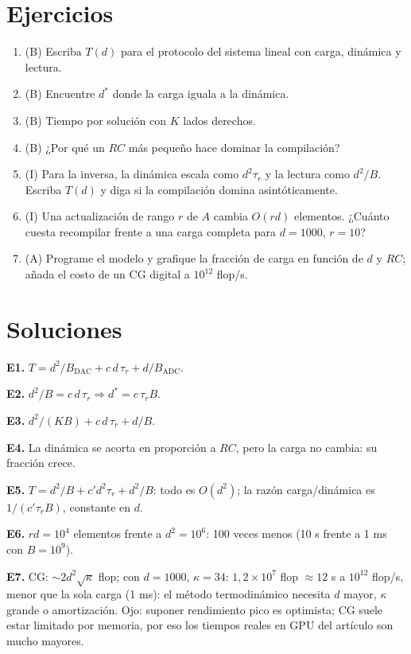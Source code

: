 \documentclass[11pt,a4paper]{article}
\begin{document}
\section{Ejercicios}
\begin{enumerate}[label=\textbf{E\arabic*.}]
\item (B) Escriba $T(d)$ para el protocolo del sistema lineal con carga, dinámica y lectura.
\item (B) Encuentre $d^\ast$ donde la carga iguala a la dinámica.
\item (B) Tiempo por solución con $K$ lados derechos.
\item (B) ¿Por qué un $RC$ más pequeño hace dominar la compilación?
\item (I) Para la inversa, la dinámica escala como $d^2\tau_r$ y la lectura como $d^2/B$. Escriba $T(d)$ y diga si la compilación domina asintóticamente.
\item (I) Una actualización de rango $r$ de $A$ cambia $O(rd)$ elementos. ¿Cuánto cuesta recompilar frente a una carga completa para $d=1000$, $r=10$?
\item (A) Programe el modelo y grafique la fracción de carga en función de $d$ y $RC$; añada el costo de un CG digital a $10^{12}$ flop/s.
\end{enumerate}
\section{Soluciones}
\begin{solucion}
\textbf{E1.} $T=d^2/B_{\text{DAC}}+c\,d\,\tau_r+d/B_{\text{ADC}}$.

\textbf{E2.} $d^2/B=c\,d\,\tau_r\Rightarrow d^\ast=c\,\tau_rB$.

\textbf{E3.} $d^2/(KB)+c\,d\,\tau_r+d/B$.

\textbf{E4.} La dinámica se acorta en proporción a $RC$, pero la carga no cambia: su fracción crece.

\textbf{E5.} $T=d^2/B+c'd^2\tau_r+d^2/B$: todo es $O(d^2)$; la razón carga/dinámica es $1/(c'\tau_rB)$, constante en $d$.

\textbf{E6.} $rd=10^4$ elementos frente a $d^2=10^6$: 100 veces menos (10 \textmu s frente a 1 ms con $B=10^9$).

\textbf{E7.} CG: $\sim2d^2\sqrt\kappa$ flop; con $d=1000$, $\kappa=34$: $1{,}2\times10^7$ flop $\approx12$ \textmu s a $10^{12}$ flop/s, menor que la sola carga (1 ms):
el método termodinámico necesita $d$ mayor, $\kappa$ grande o amortización. Ojo: suponer rendimiento pico es optimista; CG suele estar limitado por memoria, por eso los tiempos reales en GPU del artículo son mucho mayores.
\end{solucion}
\end{document}
